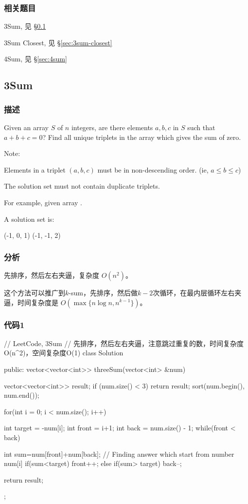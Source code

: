 \subsubsection{相关题目}
\begindot
\item 3Sum, 见 \S \ref{sec:3sum}
\item 3Sum Closest, 见 \S \ref{sec:3sum-closest}
\item 4Sum, 见 \S \ref{sec:4sum}
\myenddot


\subsection{3Sum} %
\label{sec:3sum}


\subsubsection{描述}
Given an array $S$ of $n$ integers, are there elements $a, b, c$ in $S$ such that $a + b + c = 0$? Find all unique triplets in the array which gives the sum of zero.

Note:
\begindot
\item Elements in a triplet $(a,b,c)$ must be in non-descending order. (ie, $a \leq b \leq c$)
\item The solution set must not contain duplicate triplets.
\myenddot

For example, given array .

A solution set is:
\begin{Code}
(-1, 0, 1)
(-1, -1, 2)
\end{Code}


\subsubsection{分析}
先排序，然后左右夹逼，复杂度 $O(n^2)$。

这个方法可以推广到$k$-sum，先排序，然后做$k-2$次循环，在最内层循环左右夹逼，时间复杂度是 $O(\max\{n \log n, n^{k-1}\})$。


\subsubsection{代码1}
\begin{Code}
// LeetCode, 3Sum
// 先排序，然后左右夹逼，注意跳过重复的数，时间复杂度O(n^2)，空间复杂度O(1)
class Solution {
public:
    vector<vector<int>> threeSum(vector<int> &num) {
        vector<vector<int>> result;
        if (num.size() < 3) return result;
        sort(num.begin(), num.end());
        
        for(int i = 0; i < num.size(); i++) {
            int target = -num[i];
            int front = i+1;
            int back = num.size() - 1;
            while(front < back){
                int sum=num[front]+num[back];
                // Finding answer which start from number num[i]
                if(sum<target)
                    front++;
                else if(sum> target)
                    back--;
                                

            }
        }
    return result;
    }
};
\end{Code}


